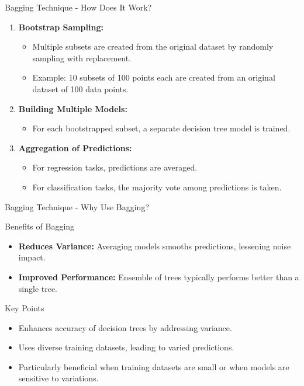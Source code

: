 \documentclass[aspectratio=169]{beamer}
\begin{document}
\begin{frame}[fragile]{Bagging Technique - How Does It Work?}
    \begin{enumerate}
        \item \textbf{Bootstrap Sampling:}
        \begin{itemize}
            \item Multiple subsets are created from the original dataset by randomly sampling with replacement.
            \item Example: 10 subsets of 100 points each are created from an original dataset of 100 data points.
        \end{itemize}

        \item \textbf{Building Multiple Models:}
        \begin{itemize}
            \item For each bootstrapped subset, a separate decision tree model is trained.
        \end{itemize}

        \item \textbf{Aggregation of Predictions:}
        \begin{itemize}
            \item For regression tasks, predictions are averaged.
            \item For classification tasks, the majority vote among predictions is taken.
        \end{itemize}
    \end{enumerate}
\end{frame}

\begin{frame}[fragile]{Bagging Technique - Why Use Bagging?}
    \begin{block}{Benefits of Bagging}
        \begin{itemize}
            \item \textbf{Reduces Variance:} Averaging models smooths predictions, lessening noise impact.
            \item \textbf{Improved Performance:} Ensemble of trees typically performs better than a single tree.
        \end{itemize}
    \end{block}

    \begin{block}{Key Points}
        \begin{itemize}
            \item Enhances accuracy of decision trees by addressing variance.
            \item Uses diverse training datasets, leading to varied predictions.
            \item Particularly beneficial when training datasets are small or when models are sensitive to variations.
        \end{itemize}
    \end{block}
\end{frame}
\end{document}
